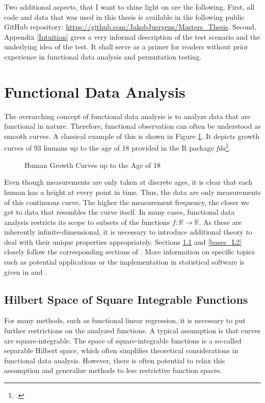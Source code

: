 \documentclass[12pt, a4paper]{article}
\theoremstyle{MAstyle} \newtheorem{assumption}{Assumption}[section]
\theoremstyle{MAstyle} \newtheorem{definition}{Definition}[section]
\theoremstyle{MAstyle} \newtheorem{theorem}{Theorem}[section]
\begin{document}
		Two additional aspects, that I want to shine light on are the following. First, all code and data that was used in this thesis is available in the following public GitHub repository: \url{https://github.com/JakobJuergens/Masters_Thesis}. 
		Second, Appendix \ref{Intuition} gives a very informal description of the test scenario and the underlying idea of the test. It shall serve as a primer for readers without prior experience in functional data analysis and permutation testing. 
	
	\section{Functional Data Analysis}\label{FDA}
		The overarching concept of functional data analysis is to analyze data that are functional in nature. Therefore, functional observation can often be understood as smooth curves. A classical example of this is shown in Figure \ref{growth_curves}. It  depicts growth curves of 93 humans up to the age of 18 provided in the R package \textit{fda}\footcite{fda}.
		\begin{figure}[H]
			\caption{Human Growth Curves up to the Age of 18}
			\label{growth_curves}
		\end{figure}
		Even though measurements are only taken at discrete ages, it is clear that each human has a height at every point in time. Thus, the data are only measurements of this continuous curve. The higher the measurement frequency, the closer we get to data that resembles the curve itself.
		In many cases, functional data analysis restricts its scope to subsets of the functions $f:\mathbb{R} \rightarrow \mathbb{R}$.
		As these are inherently infinite-dimensional, it is necessary to introduce additional theory to deal with their unique properties appropriately. Sections \ref{Square_Integrable_Functions} and \ref{bases_L2} closely follow the corresponding sections of \cite{hsing_theoretical_2015}. More information on specific topics such as potential applications or the implementation in statistical software is given in \cite{ramsay_functional_2005} and \cite{kokoszka_introduction_2021}.
	
		\subsection{Hilbert Space of Square Integrable Functions}\label{Square_Integrable_Functions}
			For many methods, such as functional linear regression, it is necessary to put further restrictions on the analyzed functions. A typical assumption is that curves are square-integrable. The space of square-integrable functions is a so-called separable Hilbert space, which often simplifies theoretical considerations in functional data analysis. However, there is often potential to relax this assumption and generalize methods to less restrictive function spaces. 
			
\end{document}
